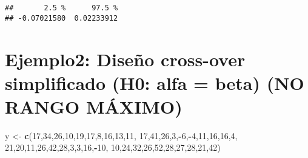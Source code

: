 \documentclass[
]{article}
\newenvironment{Shaded}{\begin{snugshade}}{\end{snugshade}}
\newcommand{\DecValTok}[1]{\textcolor[rgb]{0.00,0.00,0.81}{#1}}
\newcommand{\FunctionTok}[1]{\textcolor[rgb]{0.13,0.29,0.53}{\textbf{#1}}}
\newcommand{\NormalTok}[1]{#1}
\newcommand{\OtherTok}[1]{\textcolor[rgb]{0.56,0.35,0.01}{#1}}
\newcommand{\SpecialCharTok}[1]{\textcolor[rgb]{0.81,0.36,0.00}{\textbf{#1}}}
\begin{document}
\begin{verbatim}
##       2.5 %      97.5 % 
## -0.07021580  0.02233912
\end{verbatim}

\hypertarget{ejemplo2-diseuxf1o-cross-over-simplificado-h0-alfa-beta-no-rango-muxe1ximo}{%
\section{Ejemplo2: Diseño cross-over simplificado (H0: alfa = beta) (NO
RANGO
MÁXIMO)}\label{ejemplo2-diseuxf1o-cross-over-simplificado-h0-alfa-beta-no-rango-muxe1ximo}}

\begin{Shaded}
\begin{Highlighting}[]
\NormalTok{y }\OtherTok{\textless{}{-}} \FunctionTok{c}\NormalTok{(}\DecValTok{17}\NormalTok{,}\DecValTok{34}\NormalTok{,}\DecValTok{26}\NormalTok{,}\DecValTok{10}\NormalTok{,}\DecValTok{19}\NormalTok{,}\DecValTok{17}\NormalTok{,}\DecValTok{8}\NormalTok{,}\DecValTok{16}\NormalTok{,}\DecValTok{13}\NormalTok{,}\DecValTok{11}\NormalTok{,}
       \DecValTok{17}\NormalTok{,}\DecValTok{41}\NormalTok{,}\DecValTok{26}\NormalTok{,}\DecValTok{3}\NormalTok{,}\SpecialCharTok{{-}}\DecValTok{6}\NormalTok{,}\SpecialCharTok{{-}}\DecValTok{4}\NormalTok{,}\DecValTok{11}\NormalTok{,}\DecValTok{16}\NormalTok{,}\DecValTok{16}\NormalTok{,}\DecValTok{4}\NormalTok{,}
       \DecValTok{21}\NormalTok{,}\DecValTok{20}\NormalTok{,}\DecValTok{11}\NormalTok{,}\DecValTok{26}\NormalTok{,}\DecValTok{42}\NormalTok{,}\DecValTok{28}\NormalTok{,}\DecValTok{3}\NormalTok{,}\DecValTok{3}\NormalTok{,}\DecValTok{16}\NormalTok{,}\SpecialCharTok{{-}}\DecValTok{10}\NormalTok{,}
       \DecValTok{10}\NormalTok{,}\DecValTok{24}\NormalTok{,}\DecValTok{32}\NormalTok{,}\DecValTok{26}\NormalTok{,}\DecValTok{52}\NormalTok{,}\DecValTok{28}\NormalTok{,}\DecValTok{27}\NormalTok{,}\DecValTok{28}\NormalTok{,}\DecValTok{21}\NormalTok{,}\DecValTok{42}\NormalTok{)}


\end{Highlighting}
\end{Shaded}
\end{document}
